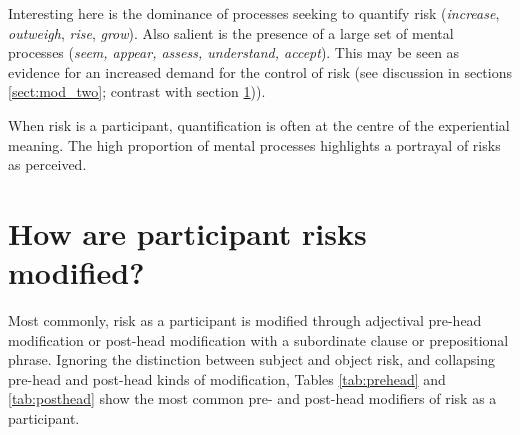 Interesting here is the dominance of processes seeking to quantify risk (\emph{increase}, \emph{outweigh}, \emph{rise}, \emph{grow}). Also salient is the presence of a large set of mental processes (\emph{seem, appear, assess, understand, accept}). This may be seen as evidence for an increased demand for the control of risk (see discussion in sections \ref{sect:mod_two}; contrast with section \ref{sect:highpotential})).


\vspace{5mm}\noindent\begin{tcolorbox}[colback=yellow!5,colframe=yellow!40!black,title=Summary: processes with risk participants]
\parbox{1\textwidth}{%
When risk is a participant, quantification is often at the centre of the experiential meaning. The high proportion of mental processes highlights a portrayal of risks as perceived.}
\end{tcolorbox}
\vspace{5mm}

\section{How are participant risks modified?} \label{sect:highpotential} \FloatBarrier

Most commonly, risk as a participant is modified through adjectival pre-head modification or post-head modification with a subordinate clause or prepositional phrase. Ignoring the distinction between subject and object risk, and collapsing pre-head and post-head kinds of modification, Tables \ref{tab:prehead} and \ref{tab:posthead} show the most common pre- and post-head modifiers of risk as a participant.


